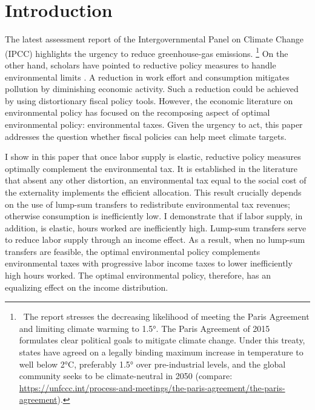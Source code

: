 \section{Introduction}


The latest assessment report of the Intergovernmental Panel on Climate Change (IPCC) \citep{IPCC2022} highlights the urgency to reduce greenhouse-gas emissions.%
\footnote{ \  The report stresses the decreasing likelihood of meeting the Paris Agreement and limiting climate warming to 1.5°. The Paris Agreement of 2015 formulates clear political goals to mitigate climate change. Under this treaty, states have agreed on a legally binding maximum increase in temperature to well below 2°C, preferably 1.5° over pre-industrial levels, and the global community seeks to be climate-neutral in 2050  (compare:\\ \url{https://unfccc.int/process-and-meetings/the-paris-agreement/the-paris-agreement}). 
}
On the other hand, scholars have pointed to reductive policy measures to handle environmental limits \citep{Arrow2004AreMuch, Schor2005SustainableReduction, Dasgupta2021}. A reduction in work effort and consumption mitigates pollution by diminishing economic activity. Such a reduction could be achieved by using distortionary fiscal policy tools.
However, the economic literature on environmental policy has focused on the recomposing aspect of optimal environmental policy: environmental taxes. %
Given the urgency to act, this paper addresses the question whether fiscal policies can help meet climate targets.

I show in this paper that once 
labor supply is elastic, reductive policy measures optimally complement the environmental tax.
It is established in the literature that absent any other distortion, an environmental tax equal to the social cost of the externality implements the efficient allocation. This result crucially depends on the use of lump-sum transfers to redistribute environmental tax revenues; otherwise consumption is inefficiently low. I demonstrate that if labor supply, in addition, is elastic, hours worked are inefficiently high. %
Lump-sum transfers serve to reduce labor supply through an income effect. As a result, when no lump-sum transfers are feasible, the optimal environmental policy complements environmental taxes with progressive labor income taxes to lower inefficiently high hours worked. 
The optimal environmental policy, therefore, has an equalizing effect on the income distribution.


